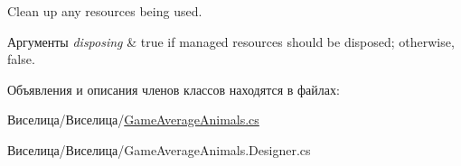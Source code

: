 Clean up any resources being used. 


\begin{DoxyParams}{Аргументы}
{\em disposing} & true if managed resources should be disposed; otherwise, false.\\
\hline
\end{DoxyParams}


Объявления и описания членов классов находятся в файлах\+:\begin{DoxyCompactItemize}
\item 
Виселица/Виселица/\hyperlink{_game_average_animals_8cs}{Game\+Average\+Animals.\+cs}\item 
Виселица/Виселица/Game\+Average\+Animals.\+Designer.\+cs\end{DoxyCompactItemize}

